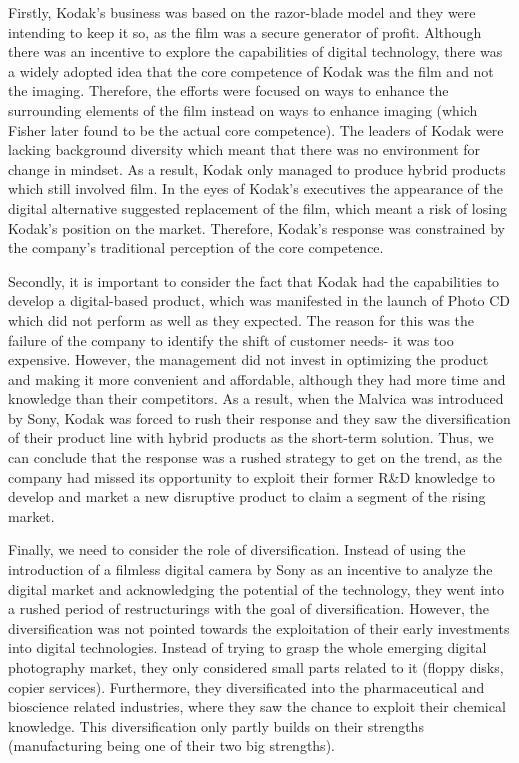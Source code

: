 \documentclass[a4paper,10pt,UTF8]{scrartcl}
\begin{document}
Firstly, Kodak's business was based on the razor-blade model and they were 
intending to keep it so, as the film was a secure generator of profit. 
Although there was an incentive to explore the capabilities of digital 
technology, there was a widely adopted idea that the core competence of 
Kodak was the film and not the imaging. Therefore, the efforts were focused 
on ways to enhance the surrounding elements of the film instead on ways to 
enhance imaging (which Fisher later found to be the actual core competence). 
The leaders of Kodak were lacking background diversity which meant that there 
was no environment for change in mindset. As a result, Kodak only managed to produce 
hybrid products which still involved film. In the eyes of Kodak's executives the appearance of the digital 
alternative suggested replacement of the film, which meant a risk of losing Kodak's position on the market. Therefore, Kodak's response was constrained by the company's traditional perception of the core competence.

Secondly, it is important to consider the fact that Kodak had the capabilities to develop a digital-based product, which was manifested in the launch of Photo CD which did not perform as well as they expected. The reason for this was the failure of the company to identify the shift of customer needs- it was too expensive. However, the management did not invest in optimizing the product and making it more convenient and affordable, although they had more time and knowledge than their competitors. As a result, when the Malvica was introduced by Sony, Kodak was forced to rush their response and they saw the diversification of their product line with hybrid products as the short-term solution. Thus, we can conclude that the response was a rushed strategy to get on the trend, as the company had missed its opportunity to exploit their former R\&D knowledge to develop and market a new disruptive product to claim a segment of the rising market.

Finally,  we need to consider the role of diversification. Instead of using the introduction of a filmless digital camera by Sony as an incentive to analyze the digital market and acknowledging the potential of the technology, they went into a rushed period of restructurings with the goal of diversification. However, the diversification was not pointed towards the exploitation of their early investments into digital technologies. Instead of trying to grasp the whole emerging digital photography market, they only considered small parts related to it (floppy disks, copier services). Furthermore, they diversificated into the pharmaceutical and bioscience related industries, where they saw the chance to exploit their chemical knowledge. This diversification only partly builds on their strengths (manufacturing being one of their two big strengths). 
\end{document}
